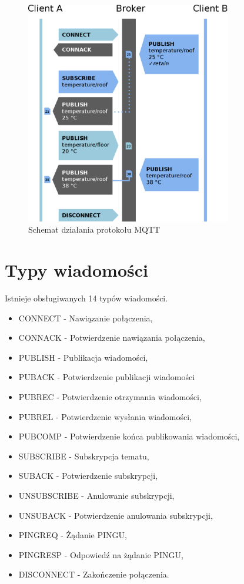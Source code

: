                     
        \begin{figure}[ht]
            \centering
            \includegraphics[width=0.8\textwidth]{img/mqtt_schematic.png}
            \caption{Schemat działania protokołu MQTT}
            \label{fig:mqtt_schematic}
        \end{figure}
         
        
    \section{Typy wiadomości}
        Istnieje obsługiwanych 14 typów wiadomości.
        
        \begin{itemize}
            \item CONNECT - Nawiązanie połączenia,
            \item CONNACK - Potwierdzenie nawiązania połączenia,
            \item PUBLISH - Publikacja wiadomości,
            \item PUBACK - Potwierdzenie publikacji wiadomości
            \item PUBREC - Potwierdzenie otrzymania wiadomości,
            \item PUBREL - Potwierdzenie wysłania wiadomości,
            \item PUBCOMP - Potwierdzenie końca publikowania wiadomości,
            \item SUBSCRIBE - Subskrypcja tematu,
            \item SUBACK - Potwierdzenie subskrypcji,
            \item UNSUBSCRIBE - Anulowanie subskrypcji,
            \item UNSUBACK - Potwierdzenie anulowania subskrypcji,
            \item PINGREQ - Żądanie PINGU,
            \item PINGRESP - Odpowiedź na żądanie PINGU,
            \item DISCONNECT - Zakończenie połączenia.
        \end{itemize}
        
